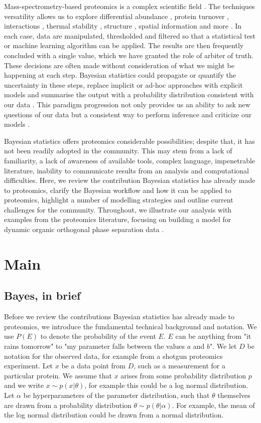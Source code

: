 \documentclass[12pt,english, journal=jpr, layout=twocolumn]{article}
\begin{document}
Mass-spectrometry-based proteomics is a complex scientific field \citep{Bantscheff::2007}. The techniques versatility allows us to explore differential abundance \citep{Bantscheff::2007}, protein turnover \citep{Mathieson::2018}, interactions \citep{Huttlin::2015}, thermal stability \citep{Mateus::2020}, structure \citep{Schopper::2017,Masson::2019}, spatial information \citep{Gessel::2014, Geladaki::2019, Barylyuk::2020} and more \citep{Toby::2016, Nightingale::2018, Johnson::2019}. In each case, data are manipulated, thresholded and filtered so that a statistical test or machine learning algorithm can be applied. The results are then frequently concluded with a single value, which we have granted the role of arbiter of truth. These decisions are often made without consideration of what we might be happening at each step. Bayesian statistics could propagate or quantify the uncertainty in these steps, replace implicit or ad-hoc approaches with explicit models and summarise the output with a probability distribution consistent with our data \citep{Gelman::2020}. This paradigm progression not only provides us an ability to ask new questions of our data but a consistent way to perform inference and criticize our models \citep{Gelman::1995, Gelman::2020}. 

Bayesian statistics offers proteomics considerable possibilities; despite that, it has not been readily adopted in the community. This may stem from a lack of familiarity, a lack of awareness of available tools, complex language, impenetrable literature, inability to communicate results from an analysis and computational difficulties. Here, we review the contribution Bayesian statistics has already made to proteomics, clarify the Bayesian workflow and how it can be applied to proteomics, highlight a number of modelling strategies and outline current challenges for the community. Throughout, we illustrate our analysis with examples from the proteomics literature, focusing on building a model for dynamic organic orthogonal phase separation data \citep{Queiroz::2019}.
\section{Main}
\subsection{Bayes, in brief}
Before we review the contributions Bayesian statistics has already made to proteomics, we introduce the fundamental technical background and notation. We use $P(E)$ to denote the probability of the event $E$. $E$ can be anything from "it rains tomorrow" to "my parameter falls between the values $a$ and $b$". We let $D$ be notation for the observed data, for example from a shotgun proteomics experiment. Let $x$ be a data point from $D$, such as a measurement for a particular protein. We assume that $x$ arises from some probability distribution $p$ and we write $x \sim p(x|\theta)$, for example this could be a log normal distribution. Let $\alpha$ be hyperparameters of the parameter distribution, such that $\theta$ themselves are drawn from a probability distribution $\theta \sim p(\theta|\alpha)$. For example, the mean of the log normal distribution could be drawn from a normal distribution. 
\end{document}
